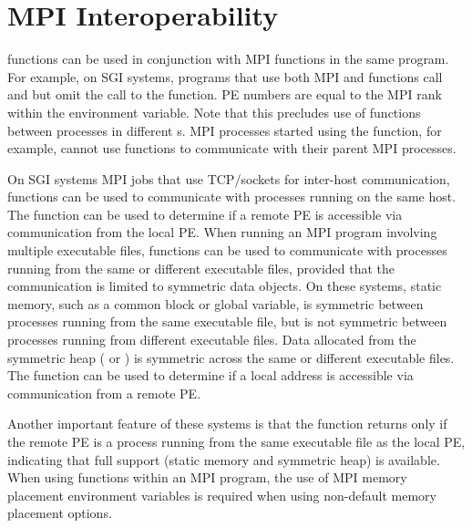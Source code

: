 \section{\ac{MPI} Interoperability}
\begin{sloppypar} %
\openshmem functions can be used in conjunction with \ac{MPI}
functions  in the same program.  For example, on SGI systems, programs that use both \ac{MPI} and \openshmem functions call  and  but omit the call to the  function.  \openshmem \ac{PE} numbers are equal to the \ac{MPI} rank within the  environment variable.  Note that this precludes use of \openshmem functions between processes in different s. 
\ac{MPI} processes started using the  function, for
example, cannot use \openshmem functions to communicate with their parent
\ac{MPI} processes.
\end{sloppypar}
On SGI systems \ac{MPI} jobs that use TCP/sockets for inter-host communication, \openshmem functions can be used to communicate with processes running on the same host.  The  function can be used to determine if a remote \ac{PE} is accessible via \openshmem communication from the local \ac{PE}. When running an \ac{MPI} program involving multiple executable files, \openshmem functions can be used to communicate with processes running from the same or different executable files, provided that the communication is limited to symmetric data objects.  On these systems, static memory, such as a \Fortran{} common block or \Clang{} global variable, is symmetric between processes running from the same executable file, but is not symmetric between processes running from different executable files.  Data allocated from the symmetric heap ( or ) is symmetric across the same or different executable files. The function  can be used to determine if a local address is accessible via \openshmem communication from a remote \ac{PE}.

 Another important feature of these systems is that the  function returns  only if the remote \ac{PE} is a process running from the same executable file as the local PE, indicating that full \openshmem support (static memory and symmetric heap) is available.  When using \openshmem functions within an \ac{MPI} program, the use of \ac{MPI} memory placement environment variables is required when using non-default memory placement options.
